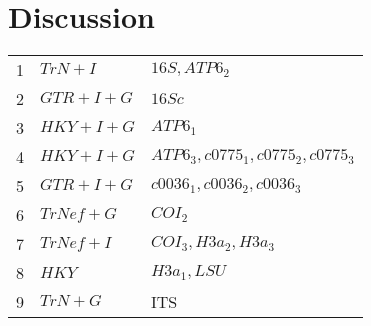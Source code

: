 \documentclass{article}\usepackage[]{graphicx}\usepackage[]{color}
\begin{document}
\section{Discussion}








\begin{table}
  \centering
  \begin{tabular} { | l | l | l |}
    1      & $TrN+I$      & $16S, ATP6_2$ \\
    2      & $GTR+I+G$    & $16Sc$        \\
    3      & $HKY+I+G$    & $ATP6_1$\\ 
    4      & $HKY+I+G$    & $ATP6_3, c0775_1, c0775_2, c0775_3$\\ 
    5      & $GTR+I+G$    & $c0036_1, c0036_2, c0036_3$\\ 
    6      & $TrNef+G$    & $COI_2$ \\
    7      & $TrNef+I$    & $COI_3, H3a_2, H3a_3$\\ 
    8      & $HKY$        & $H3a_1, LSU$\\ 
    9      & $TrN+G$      & ITS \\       
  \end{tabular}
\end{table}
\end{document}
